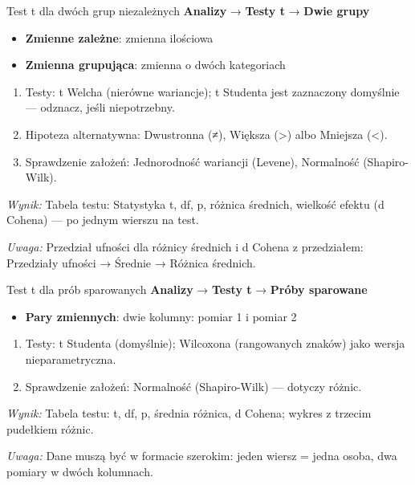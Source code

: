 \documentclass[
  polish,
  10pt,
  a4paper,
  DIV=11,
  numbers=noendperiod]{scrartcl}
\newcommand{\jmenu}[1]{{\color{upwraccent}\small #1}}
\begin{document}
\begin{jbox}{Test t dla dwóch grup niezależnych}\label{w:t-dwie-grupy}
\jmenu{\textbf{Analizy} → \textbf{Testy t} → \textbf{Dwie grupy}}

\begin{itemize}
\item[$\triangleright$] \textbf{Zmienne zależne}: zmienna ilościowa
\item[$\triangleright$] \textbf{Zmienna grupująca}: zmienna o dwóch kategoriach
\end{itemize}
\begin{enumerate}
\item Testy: t Welcha (nierówne wariancje); t Studenta jest zaznaczony domyślnie — odznacz, jeśli niepotrzebny.
\item Hipoteza alternatywna: Dwustronna (≠), Większa (\textgreater{}) albo Mniejsza (\textless{}).
\item Sprawdzenie założeń: Jednorodność wariancji (Levene), Normalność (Shapiro-Wilk).
\end{enumerate}
\textit{Wynik:} Tabela testu: Statystyka t, df, p, różnica średnich, wielkość efektu (d Cohena) — po jednym wierszu na test.

{\color{upwrsoft}\small\textit{Uwaga:} Przedział ufności dla różnicy średnich i d Cohena z przedziałem: Przedziały ufności → Średnie → Różnica średnich.}
\end{jbox}

\begin{jbox}{Test t dla prób sparowanych}\label{w:t-sparowane}
\jmenu{\textbf{Analizy} → \textbf{Testy t} → \textbf{Próby sparowane}}

\begin{itemize}
\item[$\triangleright$] \textbf{Pary zmiennych}: dwie kolumny: pomiar 1 i pomiar 2
\end{itemize}
\begin{enumerate}
\item Testy: t Studenta (domyślnie); Wilcoxona (rangowanych znaków) jako wersja nieparametryczna.
\item Sprawdzenie założeń: Normalność (Shapiro-Wilk) — dotyczy różnic.
\end{enumerate}
\textit{Wynik:} Tabela testu: t, df, p, średnia różnica, d Cohena; wykres z trzecim pudełkiem różnic.

{\color{upwrsoft}\small\textit{Uwaga:} Dane muszą być w formacie szerokim: jeden wiersz = jedna osoba, dwa pomiary w dwóch kolumnach.}
\end{jbox}
\end{document}
